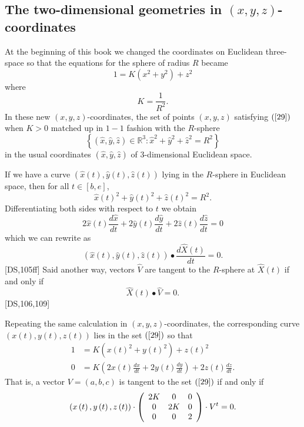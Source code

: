 \documentclass{article}%
\begin{document}
\subsection{The two-dimensional geometries in $\left(  x,y,z\right)
$-coordinates}

At the beginning of this book we changed the coordinates on Euclidean
three-space so that the equations for the sphere of radius $R$ became%
\begin{equation}
1=K\left(  x^{2}+y^{2}\right)  +z^{2} \label{29}%
\end{equation}
where%
\[
K=\frac{1}{R^{2}}.
\]
In these new $\left(  x,y,z\right)  $-coordinates, the set of points $\left(
x,y,z\right)  $ satisfying $\left(  \ref{29}\right)  $ when $K>0$ matched up
in $1-1$ fashion with the $R$-sphere%
\[
\left\{  \left(  \hat{x},\hat{y},\hat{z}\right)  \in\mathbb{R}^{3}:\hat{x}%
^{2}+\hat{y}^{2}+\hat{z}^{2}=R^{2}\right\}
\]
in the usual coordinates $\left(  \hat{x},\hat{y},\hat{z}\right)  $ of
$3$-dimensional Euclidean space.

If we have a curve $\left(  \hat{x}\left(  t\right)  ,\hat{y}\left(  t\right)
,\hat{z}\left(  t\right)  \right)  $ lying in the $R$-sphere in Euclidean
space, then for all $t\in\left[  b,e\right]  $,%
\[
\hat{x}\left(  t\right)  ^{2}+\hat{y}\left(  t\right)  ^{2}+\hat{z}\left(
t\right)  ^{2}=R^{2}.
\]
Differentiating both sides with respect to $t$ we obtain%
\[
2\hat{x}\left(  t\right)  \frac{d\hat{x}}{dt}+2\hat{y}\left(  t\right)
\frac{d\hat{y}}{dt}+2\hat{z}\left(  t\right)  \frac{d\hat{z}}{dt}=0
\]
which we can rewrite as%
\[
\left(  \hat{x}\left(  t\right)  ,\hat{y}\left(  t\right)  ,\hat{z}\left(
t\right)  \right)  \bullet\frac{d\hat{X}\left(  t\right)  }{dt}=0.
\]
[DS,105ff] Said another way, vectors $\hat{V}$ are tangent to the $R$-sphere
at $\hat{X}\left(  t\right)  $ if and only if%
\[
\hat{X}\left(  t\right)  \bullet\hat{V}=0.
\]
[DS,106,109]

Repeating the same calculation in $\left(  x,y,z\right)  $-coordinates, the
corresponding curve $\left(  x\left(  t\right)  ,y\left(  t\right)  ,z\left(
t\right)  \right)  $ lies in the set $\left(  \ref{29}\right)  $ so that%
\begin{align*}
1  &  =K\left(  x\left(  t\right)  ^{2}+y\left(  t\right)  ^{2}\right)
+z\left(  t\right)  ^{2}\\
0  &  =K\left(  2x\left(  t\right)  \frac{dx}{dt}+2y\left(  t\right)
\frac{dy}{dt}\right)  +2z\left(  t\right)  \frac{dz}{dt}.
\end{align*}
That is, a vector $V=\left(  a,b,c\right)  $ is tangent to the set $\left(
\ref{29}\right)  $ if and only if%
\begin{equation}
\left(  x\left(  t\right)  ,y\left(  t\right)  ,z\left(  t\right)  \right)
\cdot\left(
\begin{array}
[c]{ccc}%
2K & 0 & 0\\
0 & 2K & 0\\
0 & 0 & 2
\end{array}
\right)  \cdot V^{t}=0. \label{56}%
\end{equation}
\end{document}
